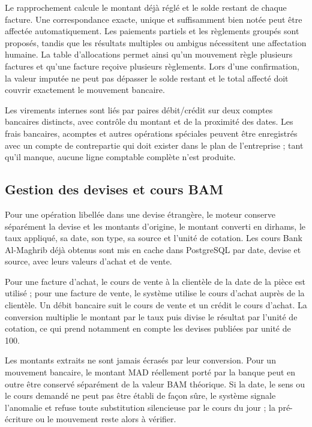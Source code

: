 \documentclass[12pt,a4paper,oneside]{report}
\begin{document}
Le rapprochement calcule le montant déjà réglé et le solde restant de chaque
facture. Une correspondance exacte, unique et suffisamment bien notée peut être
affectée automatiquement. Les paiements partiels et les règlements groupés sont
proposés, tandis que les résultats multiples ou ambigus nécessitent une
affectation humaine. La table d'allocations permet ainsi qu'un mouvement règle
plusieurs factures et qu'une facture reçoive plusieurs règlements. Lors d'une
confirmation, la valeur imputée ne peut pas dépasser le solde restant et le
total affecté doit couvrir exactement le mouvement bancaire.

Les virements internes sont liés par paires débit/crédit sur deux comptes
bancaires distincts, avec contrôle du montant et de la proximité des dates.
Les frais bancaires, acomptes et autres opérations spéciales peuvent être
enregistrés avec un compte de contrepartie qui doit exister dans le plan de
l'entreprise ; tant qu'il manque, aucune ligne comptable complète n'est
produite.

\subsection{Gestion des devises et cours BAM}

Pour une opération libellée dans une devise étrangère, le moteur conserve
séparément la devise et les montants d'origine, le montant converti en dirhams,
le taux appliqué, sa date, son type, sa source et l'unité de cotation. Les cours
Bank Al-Maghrib\cite{bam} déjà obtenus sont mis en cache dans PostgreSQL par date, devise
et source, avec leurs valeurs d'achat et de vente.

Pour une facture d'achat, le cours de vente à la clientèle de la date de la
pièce est utilisé ; pour une facture de vente, le système utilise le cours
d'achat auprès de la clientèle. Un débit bancaire suit le cours de vente et un
crédit le cours d'achat. La conversion multiplie le montant par le taux puis
divise le résultat par l'unité de cotation, ce qui prend notamment en compte
les devises publiées par unité de 100.

Les montants extraits ne sont jamais écrasés par leur conversion. Pour un
mouvement bancaire, le montant MAD réellement porté par la banque peut en outre
être conservé séparément de la valeur BAM théorique. Si la date, le sens ou le
cours demandé ne peut pas être établi de façon sûre, le système signale
l'anomalie et refuse toute substitution silencieuse par le cours du jour ; la
pré-écriture ou le mouvement reste alors à vérifier.
\end{document}
